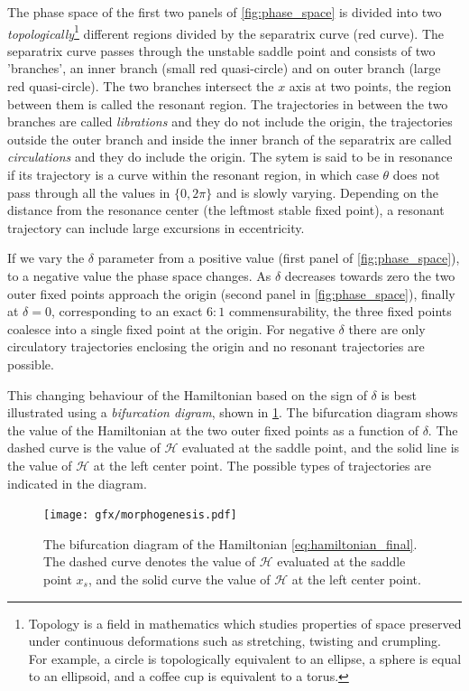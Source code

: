 \documentclass[twoside,openright,titlepage,numbers=noenddot,headinclude,%
                footinclude=true,cleardoublepage=empty,abstractoff, 
                BCOR=5mm,paper=a4,fontsize=11pt,%
                american,%
                ]{scrreprt}%
\begin{document}
The phase space of the first two panels of \cref{fig:phase_space} is divided into two
\emph{topologically}\footnote{Topology is a field in mathematics which studies 
properties of space preserved under continuous deformations such as stretching, twisting
and crumpling. For example, a circle is topologically equivalent to an ellipse, 
a sphere is equal to an ellipsoid, and a coffee cup is equivalent to a torus.} different
regions divided by the separatrix curve (red curve). The separatrix curve passes through
the unstable saddle point and consists of two
'branches', an inner branch (small red quasi-circle) and on outer branch (large red
quasi-circle).  The two branches intersect the $x$ axis at two points, the region between
them is called the resonant region. The trajectories 
in between the two branches are called \emph{librations} and they do not include the origin,
the trajectories outside the outer branch and inside the inner branch of the separatrix
are called \emph{circulations} and they do include the origin. The sytem is said to be
in resonance if its trajectory is a curve within the resonant region, in which case $\theta$
does not pass through all the values in $\{0,2\pi\}$ and is slowly varying. Depending on the
distance from the resonance center (the leftmost stable fixed point), a resonant trajectory
can include large excursions in eccentricity.

If we vary the $\delta$ parameter from a positive value (first panel of \cref{fig:phase_space}),
to a negative value the phase space changes. As $\delta$ decreases towards zero the two
outer fixed points approach the origin (second panel in \cref{fig:phase_space}), finally at 
$\delta=0$, corresponding to an exact $6:1$ commensurability, the three fixed points coalesce
into a single fixed point at the origin. For negative $\delta$ there are only circulatory 
trajectories enclosing the origin and no resonant trajectories are possible. 

This changing
behaviour of the Hamiltonian based on the sign of $\delta$ is best illustrated using
a \emph{bifurcation digram}, shown in \cref{fig:morphogenesis}. The bifurcation diagram
shows the value of the Hamiltonian at the two outer fixed points as a function of $\delta$.
The dashed curve is the value of $\mathcal{H}$ evaluated at the saddle point, and the 
solid line is the value of $\mathcal{H}$ at the left center point. The possible 
types of trajectories are indicated in the diagram.
\begin{figure}[htb]
\centering
\texttt{[image: gfx/morphogenesis.pdf]}
    \caption[Bifurcation diagram]{The bifurcation diagram of
    the Hamiltonian \ref{eq:hamiltonian_final}. 
    The dashed curve denotes the value of $\mathcal{H}$ evaluated at the saddle point $x_s$, and 
    the solid curve the value of $\mathcal{H}$ at the left center point.}
\label{fig:morphogenesis}
\end{figure}
\end{document}
